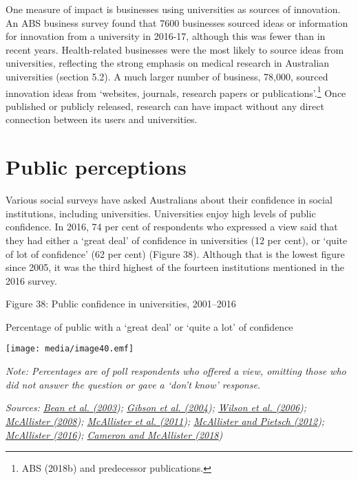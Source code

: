 \documentclass[]{book}
\begin{document}
One measure of impact is businesses using universities as sources of innovation. An ABS business survey found that 7600 businesses sourced ideas or information for innovation from a university in 2016-17, although this was fewer than in recent years. Health-related businesses were the most likely to source ideas from universities, reflecting the strong emphasis on medical research in Australian universities (section 5.2). A much larger number of business, 78,000, sourced innovation ideas from `websites, journals, research papers or publications'.\footnote{ABS (2018b) and predecessor publications.} Once published or publicly released, research can have impact without any direct connection between its users and universities.

\hypertarget{public-perceptions}{%
\section{Public perceptions}\label{public-perceptions}}

Various social surveys have asked Australians about their confidence in social institutions, including universities. Universities enjoy high levels of public confidence. In 2016, 74 per cent of respondents who expressed a view said that they had either a `great deal' of confidence in universities (12 per cent), or `quite of lot of confidence' (62 per cent) (Figure 38). Although that is the lowest figure since 2005, it was the third highest of the fourteen institutions mentioned in the 2016 survey.

\protect\hypertarget{_Ref343702103}{}{}Figure 38: Public confidence in universities, 2001--2016

Percentage of public with a `great deal' or `quite a lot' of confidence

\texttt{[image: media/image40.emf]}

\emph{Note: Percentages are of poll respondents who offered a view, omitting those who did not answer the question or gave a `don't know' response.}

\emph{Sources: \protect\hyperlink{_ENREF_32}{Bean et al. (2003}); \protect\hyperlink{_ENREF_120}{Gibson et al. (2004}); \protect\hyperlink{_ENREF_217}{Wilson et al. (2006}); \protect\hyperlink{_ENREF_142}{McAllister (2008}); \protect\hyperlink{_ENREF_145}{McAllister et al. (2011}); \protect\hyperlink{_ENREF_144}{McAllister and Pietsch (2012}); \protect\hyperlink{_ENREF_143}{McAllister (2016}); \protect\hyperlink{_ENREF_41}{Cameron and McAllister (2018})}
\end{document}
